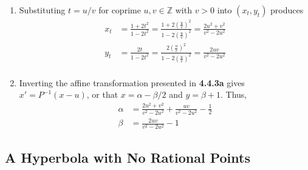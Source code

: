 \documentclass{article}
\newcommand{\Z}{\mathbb{Z}}
\newcommand{\Q}{\mathbb{Q}}
\begin{document}
\begin{enumerate}[label=\textbf{(\alph*)}]
{      Clearly, $t\in\Q\iff(x_t,y_t)\in\Q^2$.
    }
    \item{
      Substituting $t=u/v$ for coprime $u,v\in\Z$ with $v>0$ into $(x_t,y_t)$
      produces
      \begin{align*}
        x_t
          &= \frac{1+2t^2}{1-2t^2}
          = \frac{1+2\left(\frac{u}{v}\right)^2}{1-2\left(\frac{u}{v}\right)^2}
          = \frac{2u^2+v^2}{v^2-2u^2}\\
        y_t
          &= \frac{2t}{1-2t^2}
          = \frac{2\left(\frac{u}{v}\right)^2}{1-2\left(\frac{u}{v}\right)^2}
          = \frac{2uv}{v^2-2u^2}\\
      \end{align*}
    }
    \item{
      Inverting the affine transformation presented in \textbf{4.4.3a} gives
      $x'=P^{-1}(x-u)$, or that $x=\alpha-\beta/2$ and $y=\beta+1$. Thus,
      \begin{align*}
        \alpha &= \frac{2u^2+v^2}{v^2-2u^2}+\frac{uv}{v^2-2u^2}-\frac{1}{2}\\
        \beta &= \frac{2uv}{v^2-2u^2}-1
        \tag*{\qed}
      \end{align*}
    }
  \end{enumerate}

\subsection{A Hyperbola with No Rational Points}
\end{document}
